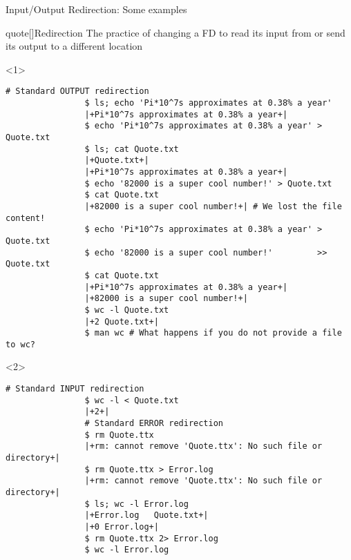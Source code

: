 \begin{frame}[fragile]{Input/Output Redirection: Some examples}
    \vspace{-5mm}
    \begin{overlayarea}{\textwidth}{0.7\textheight}
        \begin{varblock}{quote}[\textwidth]{Redirection}
            \normalsize\textnormal{The practice of changing a FD to read its input from or send its output to a different location}
        \end{varblock}
        \begin{onlyenv}<1>
            \begin{lstlisting}[style=MyBash, aboveskip=2mm]
                # Standard OUTPUT redirection
                $ ls; echo 'Pi*10^7s approximates at 0.38% a year'
                |+Pi*10^7s approximates at 0.38% a year+|
                $ echo 'Pi*10^7s approximates at 0.38% a year' > Quote.txt
                $ ls; cat Quote.txt
                |+Quote.txt+|
                |+Pi*10^7s approximates at 0.38% a year+|
                $ echo '82000 is a super cool number!' > Quote.txt
                $ cat Quote.txt
                |+82000 is a super cool number!+| # We lost the file content!
                $ echo 'Pi*10^7s approximates at 0.38% a year' >  Quote.txt
                $ echo '82000 is a super cool number!'         >> Quote.txt
                $ cat Quote.txt
                |+Pi*10^7s approximates at 0.38% a year+|
                |+82000 is a super cool number!+|
                $ wc -l Quote.txt
                |+2 Quote.txt+|
                $ man wc # What happens if you do not provide a file to wc?
            \end{lstlisting}
        \end{onlyenv}
        \begin{onlyenv}<2>
            \begin{lstlisting}[style=MyBash, aboveskip=2mm, firstnumber=19]
                # Standard INPUT redirection
                $ wc -l < Quote.txt
                |+2+|
                # Standard ERROR redirection
                $ rm Quote.ttx
                |+rm: cannot remove 'Quote.ttx': No such file or directory+|
                $ rm Quote.ttx > Error.log
                |+rm: cannot remove 'Quote.ttx': No such file or directory+|
                $ ls; wc -l Error.log
                |+Error.log   Quote.txt+|
                |+0 Error.log+|
                $ rm Quote.ttx 2> Error.log
                $ wc -l Error.log

\end{lstlisting}
\end{onlyenv}
\end{overlayarea}
\end{frame}
